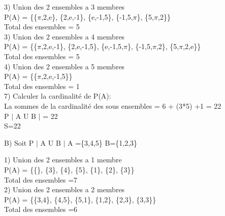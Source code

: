 3) Union des 2 ensembles a 3 membres \\

P(A) = \{\{$\pi$,2,e\}, \{2,e,-1\}, \{e,-1,5\}, \{-1,5,$\pi$\}, \{5,$\pi$,2\}\} \\

Total des ensembles = 5 \\

3) Union des 2 ensembles a 4 membres \\

P(A) = \{\{$\pi$,2,e,-1\}, \{2,e,-1,5\}, \{e,-1,5,$\pi$\}, \{-1,5,$\pi$,2\}, \{5,$\pi$,2,e\}\} \\

Total des ensembles = 5 \\

4) Union des 2 ensembles a 5 membres \\

P(A) = \{\{$\pi$,2,e,-1,5\}\} \\

Total des ensembles = 1 \\

7) Calculer la cardinalité de P(A):\\

La sommes de la cardinalité des sous ensembles = 6 + (3*5) +1 = 22\\

P $|$ A U B $|$ = 22 \\

S=22 \\

\newpage

B) Soit P $|$ A U B $|$ A =\{3,4,5\} B=\{1,2,3\} \\
\vspace{5mm} %

1) Union des 2 ensembles a 1 membre \\

P(A) = \{\{\}, \{3\}, \{4\}, \{5\}, \{1\}, \{2\}, \{3\}\} \\

Total des ensembles =7 \\

2) Union des 2 ensembles a 2 membres \\

P(A) = \{\{3,4\}, \{4,5\}, \{5,1\}, \{1,2\}, \{2,3\}, \{3,3\}\} \\

Total des ensembles =6 \\

